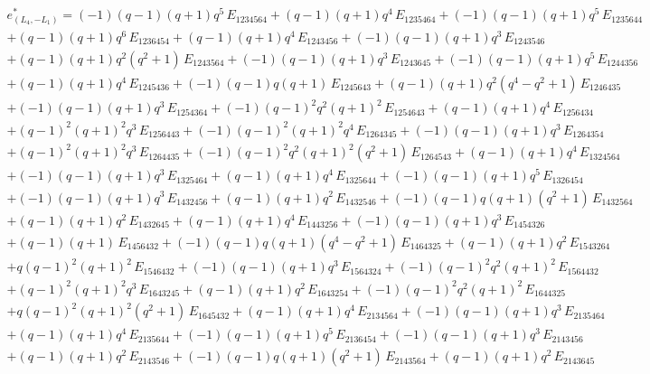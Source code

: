 \begin{multline*}
e^*_{(L_4, -L_1)} = 
  (-1) (q-1) (q+1) q^5\, E_{1234564} + (q-1) (q+1) q^4\, E_{1235464} + (-1) (q-1) (q+1) q^5\, E_{1235644}
  \\
  + (q-1) (q+1) q^6\, E_{1236454} + (q-1) (q+1) q^4\, E_{1243456} + (-1) (q-1) (q+1) q^3\, E_{1243546}
  \\
  + (q-1) (q+1) q^2 (q^2+1)\, E_{1243564} + (-1) (q-1) (q+1) q^3\, E_{1243645} + (-1) (q-1) (q+1) q^5\, E_{1244356}
  \\
  + (q-1) (q+1) q^4\, E_{1245436} + (-1) (q-1) q (q+1)\, E_{1245643} + (q-1) (q+1) q^2 (q^4 - q^2+1)\, E_{1246435}
  \\
  + (-1) (q-1) (q+1) q^3\, E_{1254364} + (-1) (q-1)^{2} q^2 (q+1)^{2}\, E_{1254643} + (q-1) (q+1) q^4\, E_{1256434}
  \\
  + (q-1)^{2} (q+1)^{2} q^3\, E_{1256443} + (-1) (q-1)^{2} (q+1)^{2} q^4\, E_{1264345} + (-1) (q-1) (q+1) q^3\, E_{1264354}
  \\
  + (q-1)^{2} (q+1)^{2} q^3\, E_{1264435} + (-1) (q-1)^{2} q^2 (q+1)^{2} (q^2+1)\, E_{1264543} + (q-1) (q+1) q^4\, E_{1324564}
  \\
  + (-1) (q-1) (q+1) q^3\, E_{1325464} + (q-1) (q+1) q^4\, E_{1325644} + (-1) (q-1) (q+1) q^5\, E_{1326454}
  \\
  + (-1) (q-1) (q+1) q^3\, E_{1432456} + (q-1) (q+1) q^2\, E_{1432546} + (-1) (q-1) q (q+1) (q^2+1)\, E_{1432564}
  \\
  + (q-1) (q+1) q^2\, E_{1432645} + (q-1) (q+1) q^4\, E_{1443256} + (-1) (q-1) (q+1) q^3\, E_{1454326}
  \\
  + (q-1) (q+1)\, E_{1456432} + (-1) (q-1) q (q+1) (q^4 - q^2+1)\, E_{1464325} + (q-1) (q+1) q^2\, E_{1543264}
  \\
  + q (q-1)^{2} (q+1)^{2}\, E_{1546432} + (-1) (q-1) (q+1) q^3\, E_{1564324} + (-1) (q-1)^{2} q^2 (q+1)^{2}\, E_{1564432}
  \\
  + (q-1)^{2} (q+1)^{2} q^3\, E_{1643245} + (q-1) (q+1) q^2\, E_{1643254} + (-1) (q-1)^{2} q^2 (q+1)^{2}\, E_{1644325}
  \\
  + q (q-1)^{2} (q+1)^{2} (q^2+1)\, E_{1645432} + (q-1) (q+1) q^4\, E_{2134564} + (-1) (q-1) (q+1) q^3\, E_{2135464}
  \\
  + (q-1) (q+1) q^4\, E_{2135644} + (-1) (q-1) (q+1) q^5\, E_{2136454} + (-1) (q-1) (q+1) q^3\, E_{2143456}
  \\
  + (q-1) (q+1) q^2\, E_{2143546} + (-1) (q-1) q (q+1) (q^2+1)\, E_{2143564} + (q-1) (q+1) q^2\, E_{2143645}

\end{multline*}
